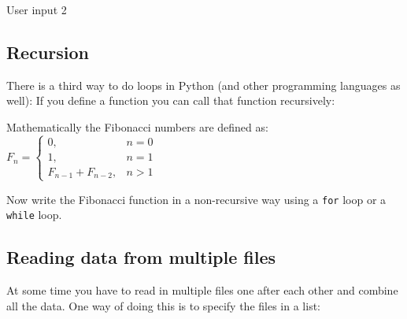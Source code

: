\ifanswers
\begin{tcolorbox}[enhanced jigsaw,breakable,pad at break*=1mm,
    colback=blue!5!white,colframe=babyblueeyes,title=Solutions,
    watermark color=white]
    User input 2
    
\end{tcolorbox}
\fi

\subsection{Recursion}

There is a third way to do loops in Python (and other programming languages as well):
If you define a function you can call that function recursively: \\

\begin{tcolorbox}[enhanced jigsaw,breakable,pad at break*=1mm,
    colback=blue!5!white,colframe=babyblueeyes,title=Recursion with Fibonacci,
    watermark color=white]
    
\end{tcolorbox}

Mathematically the Fibonacci numbers are defined as: \\

\begin{math}
    F_{n} = \left\{
        \begin{array}{ll}
            0, & n = 0 \\
            1, & n = 1 \\
            F_{n-1} + F_{n-2}, & n > 1
        \end{array}
    \right.
\end{math}

\vspace{1cm}

Now write the Fibonacci function in a non-recursive way using a \verb|for| loop or a \verb|while| loop. \\

\ifanswers
\begin{tcolorbox}[enhanced jigsaw,breakable,pad at break*=1mm,
    colback=blue!5!white,colframe=babyblueeyes,title=Solutions,
    watermark color=white]
    
\end{tcolorbox}
\fi

\subsection{Reading data from multiple files}
At some time you have to read in multiple files one after each other and combine all the data.
One way of doing this is to specify the files in a list: \\

